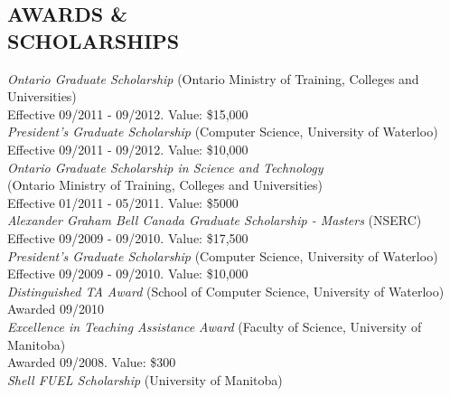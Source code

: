 \documentclass[line,margin]{res}
\begin{document}
\begin{resume}
\section{AWARDS \& \\ SCHOLARSHIPS}
  {\sl Ontario Graduate Scholarship} (Ontario Ministry of Training, Colleges and Universities) \\ 
  \hspace*{1cm} Effective 09/2011 - 09/2012. Value: \$15,000 \vspace{3pt} \\
  {\sl President's Graduate Scholarship} (Computer Science, University of Waterloo) \\
  \hspace*{1cm} Effective 09/2011 - 09/2012. Value: \$10,000 \vspace{3pt} \\
  {\sl Ontario Graduate Scholarship in Science and Technology} \\
  (Ontario Ministry of Training, Colleges and Universities) \\ 
  \hspace*{1cm} Effective 01/2011 - 05/2011. Value: \$5000 \vspace{3pt} \\
  {\sl Alexander Graham Bell Canada Graduate Scholarship - Masters} (NSERC) \\ 
  \hspace*{1cm} Effective 09/2009 - 09/2010. Value: \$17,500 \vspace{3pt} \\
  {\sl President's Graduate Scholarship} (Computer Science, University of Waterloo) \\
  \hspace*{1cm} Effective 09/2009 - 09/2010. Value: \$10,000 \vspace{3pt} \\
  {\sl Distinguished TA Award} (School of Computer Science, University of Waterloo) \\
  \hspace*{1cm} Awarded 09/2010 \vspace{3pt} \\
  {\sl Excellence in Teaching Assistance Award} (Faculty of Science, University of Manitoba) \\
  \hspace*{1cm} Awarded 09/2008. Value: \$300 \vspace{3pt} \\
  {\sl Shell FUEL Scholarship} (University of Manitoba) \\

\end{resume}
\end{document}
